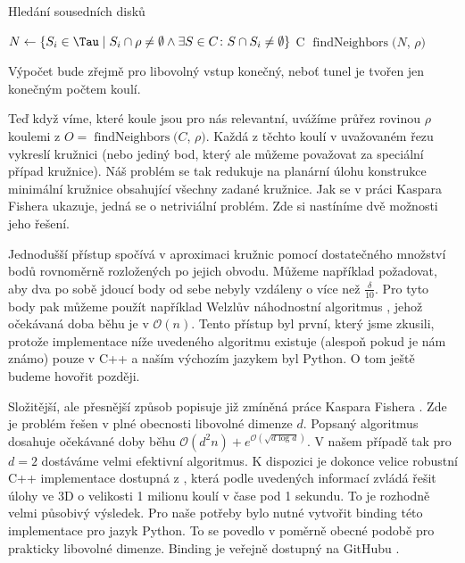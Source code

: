 \begin{algorithm}
\caption{Hledání sousedních disků}
\label{alg:findNeighbors}
\begin{algorithmic}[1]

    \State $ N \gets \{ S_i \in \Tau \mid S_i \cap \rho \neq \emptyset
        \wedge \exists S \in C \colon S \cap S_i \neq \emptyset \} $
        \State \Return C
    \Else
        \State \Return $\operatorname{findNeighbors}(N$, $\rho)$
    \EndIf
\EndFunction

\end{algorithmic}
\end{algorithm}

Výpočet bude zřejmě pro libovolný vstup konečný, neboť tunel je tvořen jen konečným
počtem koulí.

Teď když víme, které koule jsou pro nás relevantní, uvážíme průřez rovinou
$ \rho $ koulemi z $ O = \operatorname{findNeighbors}(C$, $\rho)$.
Každá z těchto koulí v uvažovaném řezu vykreslí
kružnici (nebo jediný bod, který ale můžeme považovat za speciální případ kružnice).
Náš problém se tak redukuje na planární úlohu konstrukce minimální kružnice obsahující
všechny zadané kružnice. Jak se v práci Kaspara Fishera \cite{FisherBalls} ukazuje,
jedná se o netriviální problém. Zde si nastíníme dvě možnosti jeho řešení.

Jednodušší přístup spočívá v aproximaci kružnic pomocí dostatečného množství bodů
rovnoměrně rozložených po jejich obvodu. Můžeme například požadovat, aby dva
po sobě jdoucí body od sebe nebyly vzdáleny o více než $ \frac{\delta}{10} $.
Pro tyto body pak můžeme použít například Welzlův náhodnostní algoritmus
\cite{WelzlRandom}, jehož očekávaná doba běhu je v $ \mathcal{O}(n) $. Tento
přístup byl první, který jsme zkusili, protože implementace níže uvedeného algoritmu
existuje (alespoň pokud je nám známo) pouze v C++ a naším výchozím jazykem byl
Python. O tom ještě budeme hovořit později.

Složitější, ale přesnější způsob popisuje již zmíněná práce Kaspara Fishera
\cite{FisherBalls}. Zde je problém řešen v plné obecnosti libovolné dimenze $ d $.
Popsaný algoritmus dosahuje očekávané doby běhu
$ \mathcal{O}(d^2n) + e^{\mathcal{O}(\sqrt{d \log{d}})} $. V našem případě tak pro
$ d = 2 $ dostáváme velmi efektivní algoritmus. K dispozici je dokonce velice
robustní C++ implementace dostupná z \cite{cpp_balls}, která podle uvedených informací
zvládá řešit úlohy ve 3D o velikosti 1 milionu koulí v čase pod 1 sekundu. To
je rozhodně velmi působivý výsledek. Pro naše potřeby bylo nutné vytvořit
binding této implementace pro jazyk Python. To se povedlo v poměrně obecné
podobě pro prakticky libovolné dimenze. Binding je veřejně dostupný na GitHubu
\cite{python_balls}.

